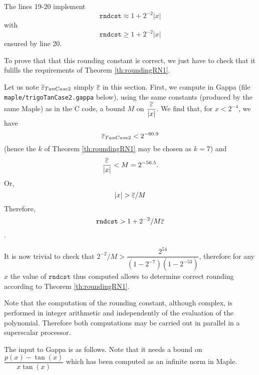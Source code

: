 The lines 19-20 implement $$\mathtt{rndcst} \approx 1 + 2^{-2}|x|$$
with
$$\mathtt{rndcst} \ge 1 + 2^{-2}|x|$$ ensured by line 20.

To prove that that this rounding constant is correct, we just have to
check that it fulills the requirements of Theorem \ref{th:roundingRN1}.

Let us note ${\overline{\varepsilon}}_{TanCase2}$ simply ${\overline{\varepsilon}}$ in this section.
First, we compute in Gappa (file\\ \texttt{maple/trigoTanCase2.gappa} below),
using the same constants (produced by the same Maple) as in the C
code, a bound $M$ on $\dfrac{{\overline{\varepsilon}}}{|x|}$. We find that, for
$x<2^{-4}$, we have
$${\overline{\varepsilon}}_{TanCase2} < 2^{-60.9} $$
(hence the $k$ of Theorem \ref{th:roundingRN1} may be chosen as $k=7$) and
$$\dfrac{{\overline{\varepsilon}}}{|x|} < M=2^{-56.5} .$$
Or, $$|x| > {\overline{\varepsilon}}/M$$
Therefore,
$$\mathtt{rndcst} > 1 + 2^{-2}/M{\overline{\varepsilon}}$$.

It is now trivial to check that $2^{-2}/M >
\dfrac{2^{54}}{(1-2^{-7})(1-2^{-53})}$, therefore for any $x$
the value of $\mathtt{rndcst}$ thus computed allows to determine
correct rounding according to Theorem \ref{th:roundingRN1}.

Note that the computation of the rounding constant, although complex, is performed in
integer arithmetic and independently of the evaluation of the polynomial.
Therefore both computations may be carried out in parallel in a superscalar processor.

The input to Gappa is as follows. Note that it needs a bound on
$\dfrac{p(x)-\tan(x)}{x \tan(x)}$ which has been computed as an infinite
norm in Maple.







